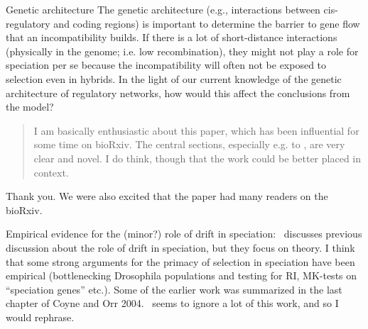 \begin{point}{Genetic architecture}
The genetic architecture (e.g., interactions between cis-regulatory and coding regions) is important to determine the barrier to gene flow that an incompatibility builds. If there is a lot of short-distance interactions (physically in the genome; i.e. low recombination), they might not play a role for speciation per se because the incompatibility will often not be exposed to selection even in hybrids. In the light of our current knowledge of the genetic architecture of regulatory networks, how would this affect the conclusions from the model?
\end{point}


\begin{quote}
  I am basically enthusiastic about this paper, which has been influential for some time on bioRxiv. The central sections, especially e.g.  to , are very clear and novel. I do think, though that the work could be better placed in context.
\end{quote}

Thank you. We were also excited that the paper had many readers on the bioRxiv. 

\begin{point}{Empirical evidence for the (minor?) role of drift in speciation:}
%
    \revref~discusses previous discussion about the role of drift in speciation, but they focus on theory. I think that some strong arguments for the primacy of selection in speciation have been empirical (bottlenecking Drosophila populations and testing for RI, MK-tests on ``speciation genes'' etc.). Some of the earlier work was summarized in the last chapter of Coyne and Orr 2004. ~seems to ignore a lot of this work, and so I would rephrase.
\end{point}

